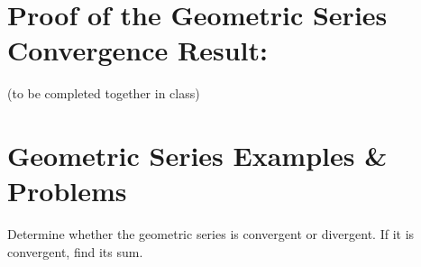 %
%
%



\section*{Proof of the Geometric Series Convergence Result:}
(to be completed together in class)
\pagebreak

\section*{Geometric Series Examples \& Problems}


Determine whether the geometric series is convergent or divergent. If it is convergent, find its sum.

